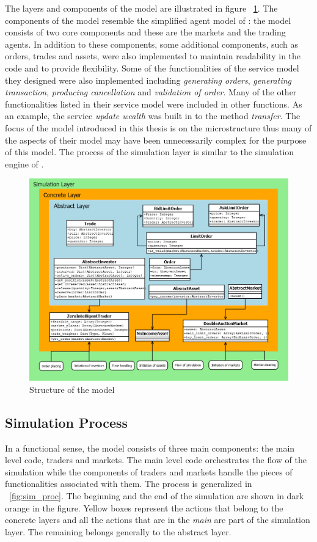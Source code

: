 The layers and components of the model are illustrated in figure ~\ref{fig:asm_structure}.
The components of the model resemble the simplified agent model of \citet{Ben12}: the model consists of 
two core components and these are the markets and the trading agents. In addition to these components, 
some additional components, such as orders, trades and assets, were also implemented to maintain readability 
in the code and to provide flexibility. Some of the functionalities 
of the service model they designed were also implemented including \textit{generating orders}, 
\textit{generating transaction}, \textit{producing cancellation} and \textit{validation of order}. 
Many of the other functionalities listed in their service model were included in other functions.
As an example, the service \textit{update wealth} was built in to the method 
\textit{transfer}. The focus of the model introduced in this thesis is on the microstructure 
thus many of the aspects of their model may have been unnecessarily complex for the purpose 
of this model. The process of the simulation layer is similar to the simulation engine of 
\citet{Julien07}.

\begin{figure}[H]
    \includegraphics[width=\linewidth]{diagrams/asm_layers.png}
    \caption{Structure of the model}
    \label{fig:asm_structure}
\end{figure}


\subsection{Simulation Process}
In a functional sense, the model consists of three main components:
the main level code, traders and markets. The main level code 
orchestrates the flow of the simulation while the components of traders 
and markets handle the pieces of functionalities associated with them. The process
is generalized in ~\ref{fig:sim_proc}. The beginning and the end of the 
simulation are shown in dark orange in the figure. Yellow boxes represent
the actions that belong to the concrete layers and all the actions that
are in the \textit{main} are part of the simulation layer. The remaining belongs
generally to the abstract layer.


